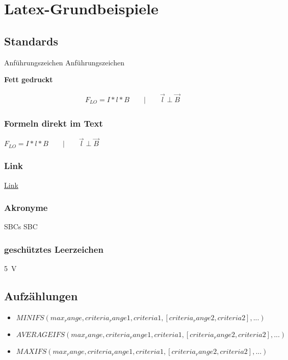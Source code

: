 \chapter{Latex-Grundbeispiele}\label{sec:neues_kapitel}

\section{Standards}
\glqq Anführungszeichen \grqq{}                          %
\grqq Anführungszeichen \grqq{}                          %

\textbf{Fett gedruckt}                                   %

\begin{align}                                   %
    F_{LO} = I*l*B \qquad | \qquad \vec{l}  \perp \vec{B} \label{formel:lorentz}
\end{align}

\subsection{Formeln direkt im Text}
$F_{LO} = I*l*B \qquad | \qquad \vec{l}\perp \vec{B}$            %

\subsection{Link}
\href{https://www.dsl-ltd.co.uk/what-are-single-board-computers-and-how-are-they-used/}{Link}


\subsection{Akronyme}
\acp{SBC}
\acf{SBC}
\subsection*{geschütztes Leerzeichen}
5~V

\section{Aufzählungen}

\begin{itemize}                                         %
        \item $MINIFS(max_range, criteria_range1, criteria1, [criteria_range2, criteria2], ...)$
        \item $AVERAGEIFS(max_range, criteria_range1, criteria1, [criteria_range2, criteria2], ...)$
        \item $MAXIFS(max_range, criteria_range1, criteria1, [criteria_range2, criteria2], ...)$\cite{SBCs,fritzing}
\end{itemize}


